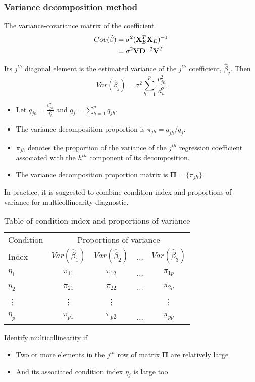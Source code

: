\subsubsection*{Variance decomposition method}

The variance-covariance matrix of the coefficient
\begin{equation*}
	\begin{aligned}
		Cov(\hat{\beta}) 
		&= \sigma^2 (\mathbf{X}_E^T \mathbf{X}_E)^{-1} \\
		&= \sigma^2 \mathbf{V}\mathbf{D}^{-2} \mathbf{V}^T\\
	\end{aligned}
\end{equation*}

Its $j^{th}$ diagonal element is the estimated variance of the $j^{th}$ coefficient, $\hat{\beta}_j$.
Then
\begin{equation*}
	Var(\hat{\beta}_j) 
	= \sigma^2 \sum\limits_{h=1}^p{\frac{v_{jh}^2}{d_h^2}}
\end{equation*}


\begin{itemize}
	\item Let $q_{jh} = \frac{v_{jh}^2}{d_h^2}$ and $q_j = \sum\limits_{h=1}^p {q_{jh}}$.
	\item The variance decomposition proportion is $\pi_{jh} = q_{jh}/q_j$.
	\item $\pi_{jh}$ denotes the proportion of the variance of the $j^{th}$ regression coefficient associated with the $h^{th}$ component of its decomposition.
	\item The variance decomposition proportion matrix is $\mathbf{\Pi} = \{\pi_{jh}\}$.
\end{itemize}

In practice, it is suggested to combine condition index and proportions of variance for multicollinearity diagnostic.
\begin{table*}
	\centering
	\begin{tabular}{lcccc}
		\toprule
		Condition & \multicolumn{4}{c}{Proportions of variance}\\
		Index & $Var(\hat{\beta}_1)$ & $Var(\hat{\beta}_2)$ & ... & $Var(\hat{\beta}_3)$\\ 
		\hline
		$\eta_1$ & $\pi_{11}$ & $\pi_{12}$ & ... & $\pi_{1p}$\\
		$\eta_2$ & $\pi_{21}$ & $\pi_{22}$ & ... & $\pi_{2p}$\\
		\vdots & \vdots & \vdots & & \vdots\\
		$\eta_p$ & $\pi_{p1}$ & $\pi_{p2}$ & ... & $\pi_{pp}$\\
		\bottomrule
	\end{tabular}
	\caption{
		Table of condition index and proportions of variance}
\end{table*}
Identify multicollinearity if
\begin{itemize}
	\item Two or more elements in the $j^{th}$ row of matrix $\mathbf{\Pi}$ are relatively large
	\item And its associated condition index $\eta_j$ is large too
\end{itemize}

